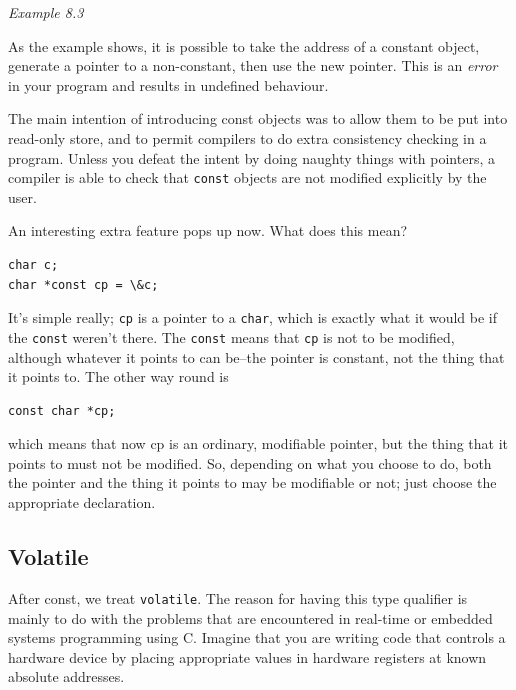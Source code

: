 \begin{center}\textit{Example 8.3}\end{center}


   As the example shows, it is possible to take the address of a constant
    object, generate a pointer to a non-constant, then use the new pointer.
    This is an \textit{error} in your program and results in undefined
    behaviour.


   The main intention of introducing const objects was to allow them to
    be put into read-only store, and to permit compilers to do extra
    consistency checking in a program. Unless you defeat the intent by doing
    naughty things with pointers, a compiler is able to check that
    \texttt{const} objects are not modified explicitly by the user.


   An interesting extra feature pops up now. What does this mean?


\begin{Verbatim}
char c;
char *const cp = \&c;
\end{Verbatim}

   It's simple really; \texttt{cp} is a pointer to
    a \texttt{char}, which is exactly what it would be if the
    \texttt{const} weren't there. The \texttt{const} means that
    \texttt{cp} is not to be modified, although whatever it points to
    can be--the pointer is constant, not the thing that it points to.
    The other way round is


\begin{Verbatim}
const char *cp;
\end{Verbatim}

   which means that now cp is an ordinary, modifiable pointer, but the
    thing that it points to must not be modified. So, depending on what you
    choose to do, both the pointer and the thing it points to may be
    modifiable or not; just choose the appropriate declaration.


  

  \subsection{Volatile}
   

   After const, we treat \texttt{volatile}. The reason for having
    this type qualifier is mainly to do with the problems that are
    encountered in real-time or embedded systems programming using C.
    Imagine that you are writing code that controls a hardware device by
    placing appropriate values in hardware registers at known absolute
    addresses.



